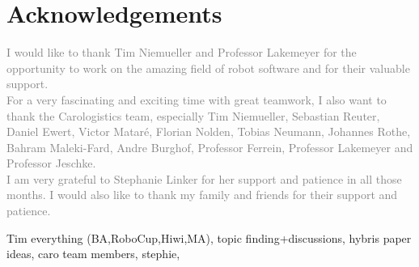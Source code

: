\newpage

\section*{Acknowledgements}


\textcolor{gray}{
I would like to thank Tim Niemueller and Professor Lakemeyer for the
opportunity to work on the amazing field of robot software and for
their valuable support.\\ For a very fascinating and exciting time
with great teamwork, I also want to thank the Carologistics team,
especially Tim Niemueller, Sebastian Reuter, Daniel Ewert, Victor
Matar\'{e}, Florian Nolden, Tobias Neumann, Johannes Rothe, Bahram
Maleki-Fard, Andre Burghof, Professor Ferrein, Professor Lakemeyer and
Professor Jeschke.\\ I am very grateful to Stephanie Linker
for her support and patience in all those months. I would also like to
thank my family and friends for their support and patience.
}

Tim everything (BA,RoboCup,Hiwi,MA), topic finding+discussions, hybris paper ideas, caro team members, stephie, 

\color{black}